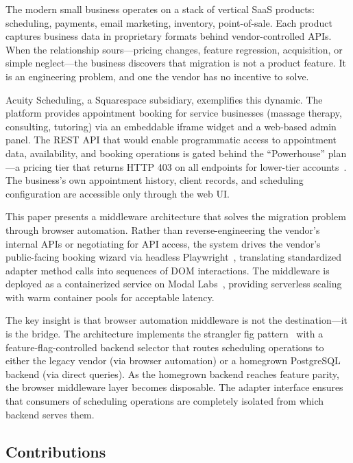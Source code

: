 \documentclass[conference]{IEEEtran}
\begin{document}
The modern small business operates on a stack of vertical SaaS products: scheduling, payments, email marketing, inventory, point-of-sale. Each product captures business data in proprietary formats behind vendor-controlled APIs. When the relationship sours---pricing changes, feature regression, acquisition, or simple neglect---the business discovers that migration is not a product feature. It is an engineering problem, and one the vendor has no incentive to solve.

Acuity Scheduling, a Squarespace subsidiary, exemplifies this dynamic. The platform provides appointment booking for service businesses (massage therapy, consulting, tutoring) via an embeddable iframe widget and a web-based admin panel. The REST API that would enable programmatic access to appointment data, availability, and booking operations is gated behind the ``Powerhouse'' plan---a pricing tier that returns HTTP 403 on all endpoints for lower-tier accounts~\cite{acuity-api}. The business's own appointment history, client records, and scheduling configuration are accessible only through the web UI.

This paper presents a middleware architecture that solves the migration problem through browser automation. Rather than reverse-engineering the vendor's internal APIs or negotiating for API access, the system drives the vendor's public-facing booking wizard via headless Playwright~\cite{playwright}, translating standardized adapter method calls into sequences of DOM interactions. The middleware is deployed as a containerized service on Modal Labs~\cite{modal}, providing serverless scaling with warm container pools for acceptable latency.

The key insight is that browser automation middleware is not the destination---it is the bridge. The architecture implements the strangler fig pattern~\cite{fowler-strangler} with a feature-flag-controlled backend selector that routes scheduling operations to either the legacy vendor (via browser automation) or a homegrown PostgreSQL backend (via direct queries). As the homegrown backend reaches feature parity, the browser middleware layer becomes disposable. The adapter interface ensures that consumers of scheduling operations are completely isolated from which backend serves them.

\subsection{Contributions}
\end{document}
